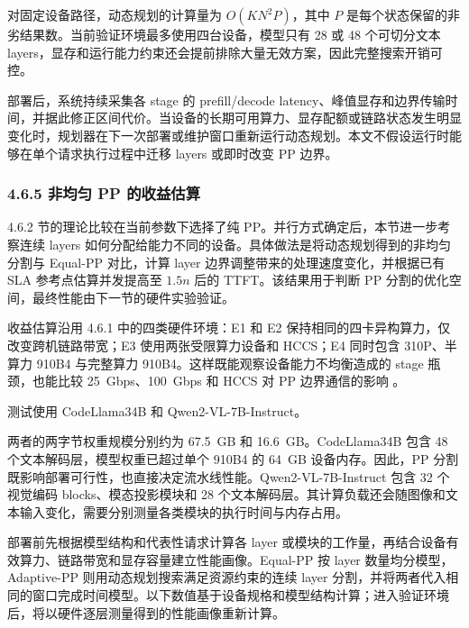 对固定设备路径，动态规划的计算量为 \(O(KN^2P)\)，其中 \(P\) 是每个状态保留的非劣结果数。当前验证环境最多使用四台设备，模型只有 28 或 48 个可切分文本 layers，显存和运行能力约束还会提前排除大量无效方案，因此完整搜索开销可控。

部署后，系统持续采集各 stage 的 prefill/decode latency、峰值显存和边界传输时间，并据此修正区间代价。当设备的长期可用算力、显存配额或链路状态发生明显变化时，规划器在下一次部署或维护窗口重新运行动态规划。本文不假设运行时能够在单个请求执行过程中迁移 layers 或即时改变 PP 边界。

\subsubsection*{4.6.5 非均匀 PP 的收益估算}

4.6.2 节的理论比较在当前参数下选择了纯 PP。并行方式确定后，本节进一步考察连续 layers 如何分配给能力不同的设备。具体做法是将动态规划得到的非均匀分割与 Equal-PP 对比，计算 layer 边界调整带来的处理速度变化，并根据已有 SLA 参考点估算并发提高至 \(1.5n\) 后的 TTFT。该结果用于判断 PP 分割的优化空间，最终性能由下一节的硬件实验验证。

收益估算沿用 4.6.1 中的四类硬件环境：E1 和 E2 保持相同的四卡异构算力，仅改变跨机链路带宽；E3 使用两张受限算力设备和 HCCS；E4 同时包含 310P、半算力 910B4 与完整算力 910B4。这样既能观察设备能力不均衡造成的 stage 瓶颈，也能比较 25~Gbps、100~Gbps 和 HCCS 对 PP 边界通信的影响 \cite{huawei2026internal}。

测试使用 CodeLlama34B 和 Qwen2-VL-7B-Instruct。

两者的两字节权重规模分别约为 67.5~GB 和 16.6~GB。CodeLlama34B 包含 48 个文本解码层，模型权重已超过单个 910B4 的 64~GB 设备内存。因此，PP 分割既影响部署可行性，也直接决定流水线性能。Qwen2-VL-7B-Instruct 包含 32 个视觉编码 blocks、模态投影模块和 28 个文本解码层。其计算负载还会随图像和文本输入变化，需要分别测量各类模块的执行时间与内存占用。

部署前先根据模型结构和代表性请求计算各 layer 或模块的工作量，再结合设备有效算力、链路带宽和显存容量建立性能画像。Equal-PP 按 layer 数量均分模型，Adaptive-PP 则用动态规划搜索满足资源约束的连续 layer 分割，并将两者代入相同的窗口完成时间模型。以下数值基于设备规格和模型结构计算；进入验证环境后，将以硬件逐层测量得到的性能画像重新计算。

